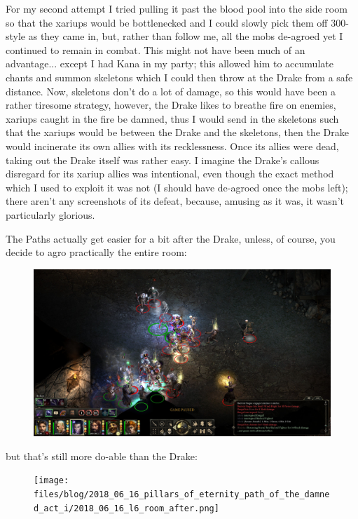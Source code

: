 \documentclass{article}
\begin{document}
For my second attempt I tried pulling it past the blood pool into the side room so that the xariups would be bottlenecked and I could slowly pick them off 300-style as they came in, but, rather than follow me, all the mobs de-agroed yet I continued to remain in combat.  This might not have been much of an advantage... except I had Kana in my party; this allowed him to accumulate chants and summon skeletons which I could then throw at the Drake from a safe distance.  Now, skeletons don't do a lot of damage, so this would have been a rather tiresome strategy, however, the Drake likes to breathe fire on enemies, xariups caught in the fire be damned, thus I would send in the skeletons such that the xariups would be between the Drake and the skeletons, then the Drake would incinerate its own allies with its recklessness.  Once its allies were dead, taking out the Drake itself was rather easy.  I imagine the Drake's callous disregard for its xariup allies was intentional, even though the exact method which I used to exploit it was not (I should have de-agroed once the mobs left); there aren't any screenshots of its defeat, because, amusing as it was, it wasn't particularly glorious.

The Paths actually get easier for a bit after the Drake, unless, of course, you decide to agro practically the entire room:

\begin{figure}
\includegraphics[scale=0.33]{files/blog/2018_06_16_pillars_of_eternity_path_of_the_damned_act_i/2018_06_16_l6_room_before.jpg}
\end{figure}

but that's still more do-able than the Drake:

\begin{figure}
\texttt{[image: files/blog/2018\_06\_16\_pillars\_of\_eternity\_path\_of\_the\_damned\_act\_i/2018\_06\_16\_l6\_room\_after.png]}
\end{figure}
\end{document}
